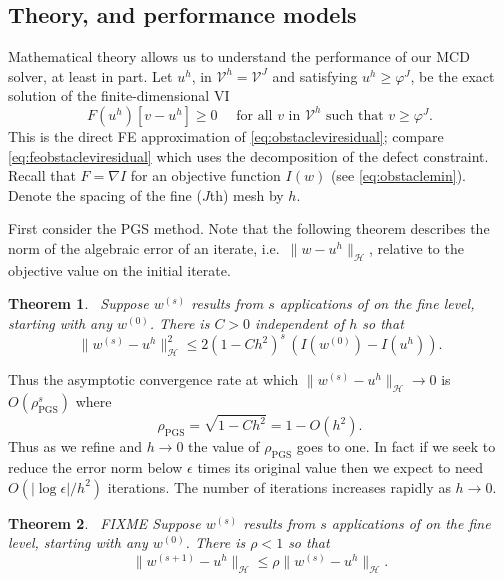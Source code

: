 \documentclass[letterpaper,final,12pt,reqno]{amsart}
\theoremstyle{claim}
\newtheorem{theorem}{Theorem}
\newcommand{\eps}{\epsilon}
\newcommand{\grad}{\nabla}
\numberwithin{equation}{section}
\numberwithin{figure}{section}
\numberwithin{table}{section}
\numberwithin{theorem}{section}
\begin{document}
\subsection*{Theory, and performance models}  Mathematical theory allows us to understand the performance of our MCD solver, at least in part.  Let $u^h$, in $\mathcal{V}^h = \mathcal{V}^J$ and satisfying $u^h \ge \varphi^J$, be the exact solution of the finite-dimensional VI
\begin{equation}
  F(u^h)[v-u^h] \ge 0 \quad \text{ for all } v \text{ in $\mathcal{V}^h$ such that } v \ge \varphi^J. \label{eq:feobstaclevioriginal}
\end{equation}
This is the direct FE approximation of \eqref{eq:obstacleviresidual}; compare \eqref{eq:feobstacleviresidual} which uses the decomposition of the defect constraint.  Recall that $F=\grad I$ for an objective function $I(w)$ (see \eqref{eq:obstaclemin}).  Denote the spacing of the fine ($J$th) mesh by $h$.

First consider the PGS method.  Note that the following theorem describes the norm of the algebraic error of an iterate, i.e.~$\|w-u^h\|_{\mathcal{H}}$, relative to the objective value on the initial iterate.

\begin{theorem} \cite[Prop.~4.5]{GraeserKornhuber2009}\,  \label{thm:pgsconvergence}  Suppose $w^{(s)}$  results from $s$ applications of  on the fine level, starting with any $w^{(0)}$.  There is $C>0$ independent of $h$ so that
\begin{equation}
  \|w^{(s)} - u^h\|_{\mathcal{H}}^2 \le 2 (1-C h^2)^s\,\left(I(w^{(0)}) - I(u^h)\right).  \label{eq:pgsconvergence}
\end{equation}
\end{theorem}

Thus the asymptotic convergence rate at which $\|w^{(s)} - u^h\|_{\mathcal{H}} \to 0$ is $O(\rho_{\text{PGS}}^s)$ where
    $$\rho_{\text{PGS}} = \sqrt{1-Ch^2} = 1 - O(h^2).$$
Thus as we refine and $h\to 0$ the value of $\rho_{\text{PGS}}$ goes to one.  In fact if we seek to reduce the error norm below $\eps$ times its original value then we expect to need $O(|\log\eps|/h^2)$ iterations.  The number of iterations increases rapidly as $h\to 0$.

\begin{theorem} \cite[Thm.~4.6]{GraeserKornhuber2009}\,  \label{thm:mcdlconvergence}  FIXME Suppose $w^{(s)}$  results from $s$ applications of  on the fine level, starting with any $w^{(0)}$.  There is $\rho<1$ so that
\begin{equation}
  \|w^{(s+1)} - u^h\|_{\mathcal{H}} \le \rho \|w^{(s)} - u^h\|_{\mathcal{H}}.  \label{eq:mcdlconvergence}
\end{equation}
\end{theorem}
\end{document}
